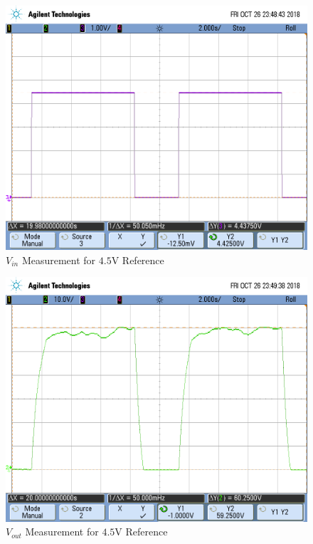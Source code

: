 \FloatBarrier


\FloatBarrier

\begin{figure}[h!]
	\centering
	\includegraphics[scale=0.75]{../images/scope_14.png}
	\caption{$V_{in}$ Measurement for $4.5$\si{\volt} Reference}
	\label{fig:scope_14}
\end{figure}

\FloatBarrier

\FloatBarrier

\begin{figure}[h!]
	\centering
	\includegraphics[scale=0.75]{../images/scope_15.png}
	\caption{$V_{out}$ Measurement for $4.5$\si{\volt} Reference}
	\label{fig:scope_15}
\end{figure}

